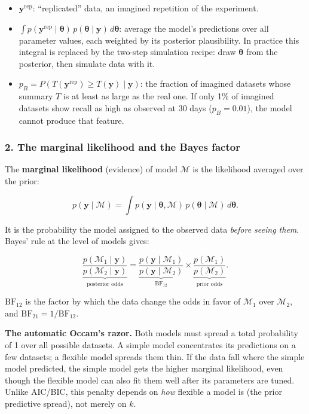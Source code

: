 \begin{itemize}
\tightlist
\item
  \(\mathbf{y}^{\text{rep}}\): ``replicated'' data, an imagined
  repetition of the experiment.
\item
  \(\int p(\mathbf{y}^{\text{rep}} \mid \boldsymbol\theta)\, p(\boldsymbol\theta \mid \mathbf{y})\, d\boldsymbol\theta\):
  average the model's predictions over all parameter values, each
  weighted by its posterior plausibility. In practice this integral is
  replaced by the two-step simulation recipe: draw \(\boldsymbol\theta\)
  from the posterior, then simulate data with it.
\item
  \(p_B = P(T(\mathbf{y}^{\text{rep}}) \ge T(\mathbf{y}) \mid \mathbf{y})\):
  the fraction of imagined datasets whose summary \(T\) is at least as
  large as the real one. If only 1\% of imagined datasets show recall as
  high as observed at 30 days (\(p_B = 0.01\)), the model cannot produce
  that feature.
\end{itemize}

\subsubsection{2. The marginal likelihood and the Bayes factor}

The \textbf{marginal likelihood} (evidence) of model \(\mathcal{M}\) is
the likelihood averaged over the prior:

\[
p(\mathbf{y} \mid \mathcal{M}) = \int p(\mathbf{y} \mid \boldsymbol\theta, \mathcal{M})\, p(\boldsymbol\theta \mid \mathcal{M})\, d\boldsymbol\theta.
\]

It is the probability the model assigned to the observed data
\emph{before seeing them}. Bayes' rule at the level of models gives:

\[
\underbrace{\frac{p(\mathcal{M}_1 \mid \mathbf{y})}{p(\mathcal{M}_2 \mid \mathbf{y})}}_{\text{posterior odds}}
= \underbrace{\frac{p(\mathbf{y} \mid \mathcal{M}_1)}{p(\mathbf{y} \mid \mathcal{M}_2)}}_{\mathrm{BF}_{12}}
\times \underbrace{\frac{p(\mathcal{M}_1)}{p(\mathcal{M}_2)}}_{\text{prior odds}}.
\]

\(\mathrm{BF}_{12}\) is the factor by which the data change the odds in
favor of \(\mathcal{M}_1\) over \(\mathcal{M}_2\), and
\(\mathrm{BF}_{21} = 1/\mathrm{BF}_{12}\).

\textbf{The automatic Occam's razor.} Both models must spread a total
probability of 1 over all possible datasets. A simple model concentrates
its predictions on a few datasets; a flexible model spreads them thin.
If the data fall where the simple model predicted, the simple model gets
the higher marginal likelihood, even though the flexible model can also
fit them well after its parameters are tuned. Unlike AIC/BIC, this
penalty depends on \emph{how} flexible a model is (the prior predictive
spread), not merely on \(k\).

